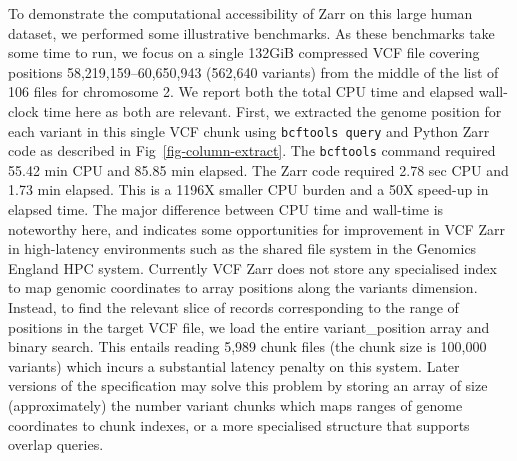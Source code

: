 \documentclass[a4paper,num-refs]{oup-contemporary}
\begin{document}
To demonstrate the computational accessibility of Zarr on this
large human dataset, we performed some illustrative benchmarks.
As these benchmarks take some time to run, we focus
on a single 132GiB compressed VCF file covering
positions 58,219,159--60,650,943 (562,640 variants)
from the middle of the list of 106 files for chromosome 2.
We report both the total CPU time and elapsed wall-clock time here
as both are relevant.
First, we extracted the genome position for each variant in this single VCF
chunk using \texttt{bcftools query} and Python Zarr code as described in
Fig~\ref{fig-column-extract}. The \texttt{bcftools} command required
55.42 min CPU and 85.85 min elapsed.
The Zarr code required 2.78 sec CPU and 1.73 min elapsed.
This is a 1196X smaller CPU burden and a 50X speed-up in elapsed time.
The major difference between CPU time and wall-time is noteworthy
here, and indicates some opportunities for improvement in VCF Zarr
in high-latency environments such as the shared file system in the
Genomics England HPC system. Currently VCF Zarr does not store any
specialised index to map genomic coordinates to array positions
along the variants dimension. Instead, to find the relevant slice
of records corresponding to the range of positions in the target
VCF file, we load the entire variant\_position array and
binary search. This entails reading 5,989 chunk files
(the chunk size is 100,000 variants) which incurs a substantial
latency penalty on this system. Later versions of the specification
may solve this problem by storing an array of size
(approximately) the number variant chunks
which maps ranges of genome coordinates to chunk indexes,
or a more specialised structure that supports overlap queries.

\end{document}
